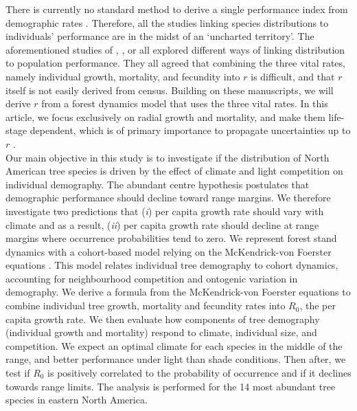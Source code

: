 There is currently no standard method to derive a single performance index from demographic rates \citep{Purves2009}. Therefore, all the studies linking species distributions to individuals' performance are in the midst of an `uncharted territory'. The aforementioned studies of \citeauthor{McGill2012}, \citeauthor{Thuiller2014}, or \citeauthor{Pagel2012} all explored different ways of linking distribution to population performance. They all agreed that combining the three vital rates, namely individual growth, mortality, and fecundity into $ r $ is difficult, and that $ r $ itself is not easily derived from census. Building on these manuscripts, we will derive $ r $ from a forest dynamics model that uses the three vital rates. In this article, we focus exclusively on radial growth and mortality, and make them life-stage dependent, which is of primary importance to propagate uncertainties up to $ r $ \citep[$ \lambda $ in his article]{Clark2003b}. \\

Our main objective in this study is to investigate if the distribution of North American tree species is driven by the effect of climate and light competition on individual demography. The abundant centre hypothesis postulates that demographic performance should decline toward range margins. We therefore investigate two predictions that (\textit{i}) per capita growth rate should vary with climate and as a result, (\textit{ii}) per capita growth rate should decline at range margins where occurrence probabilities tend to zero. We represent forest stand dynamics with a cohort-based model relying on the McKendrick-von Foerster equations \citep{Strigul2008}. This model relates individual tree demography to cohort dynamics, accounting for neighbourhood competition and ontogenic variation in demography. We derive a formula from the McKendrick-von Foerster equations to combine individual tree growth, mortality and fecundity rates into $ R_0 $, the per capita growth rate. We then evaluate how components of tree demography (individual growth and mortality) respond to climate, individual size, and competition. We expect an optimal climate for each species in the middle of the range, and better performance under light than shade conditions. Then after, we test if $ R_0 $ is positively correlated to the probability of occurrence and if it declines towards range limits. The analysis is performed for the 14 most abundant tree species in eastern North America.

